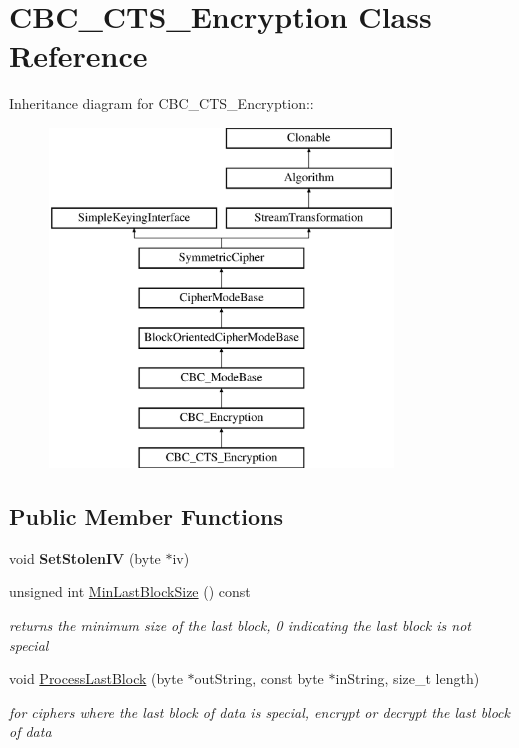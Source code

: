 \hypertarget{class_c_b_c___c_t_s___encryption}{
\section{CBC\_\-CTS\_\-Encryption Class Reference}
\label{class_c_b_c___c_t_s___encryption}
}
Inheritance diagram for CBC\_\-CTS\_\-Encryption::\begin{figure}[H]
\begin{center}
\leavevmode
\includegraphics[height=9cm]{class_c_b_c___c_t_s___encryption}
\end{center}
\end{figure}
\subsection*{Public Member Functions}
\begin{DoxyCompactItemize}
\item 
\hypertarget{class_c_b_c___c_t_s___encryption_a447be2f4df793a07257b18137344279c}{
void {\bfseries SetStolenIV} (byte $\ast$iv)}
\label{class_c_b_c___c_t_s___encryption_a447be2f4df793a07257b18137344279c}

\item 
\hypertarget{class_c_b_c___c_t_s___encryption_a6cdc4bc20f0b9834ee7c5e0409fef805}{
unsigned int \hyperlink{class_c_b_c___c_t_s___encryption_a6cdc4bc20f0b9834ee7c5e0409fef805}{MinLastBlockSize} () const }
\label{class_c_b_c___c_t_s___encryption_a6cdc4bc20f0b9834ee7c5e0409fef805}

\begin{DoxyCompactList}\small\item\em returns the minimum size of the last block, 0 indicating the last block is not special \item\end{DoxyCompactList}\item 
void \hyperlink{class_c_b_c___c_t_s___encryption_afa5e227b89c39bff1386df7cebaa5f32}{ProcessLastBlock} (byte $\ast$outString, const byte $\ast$inString, size\_\-t length)
\begin{DoxyCompactList}\small\item\em for ciphers where the last block of data is special, encrypt or decrypt the last block of data \item\end{DoxyCompactList}\end{DoxyCompactItemize}
